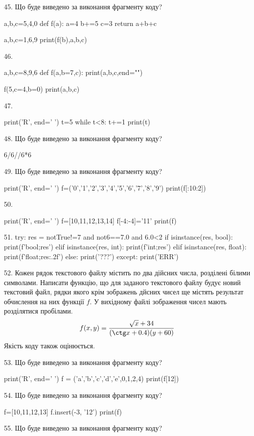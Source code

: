 \documentclass[11pt]{article}
\begin{document}
45. Що буде виведено за виконання фрагменту коду?

a,b,c=5,4,0
def f(a):
    a=4
    b+=5
    c=3
    return a+b+c

a,b,c=1,6,9
print(f(b),a,b,c)

46. 

a,b,c=8,9,6
def f(a,b=7,c):
    print(a,b,c,end="")

f(5,c=4,b=0)
print(a,b,c)


47. 

print('R', end=' ')
t=5
while t<8:
    t+=1
print(t)


48. Що буде виведено за виконання фрагменту коду?

6/6//6*6

49. Що буде виведено за виконання фрагменту коду?

print('R', end=' ')
f=('0','1','2','3','4','5','6','7','8','9')
print(f[:10:2])


50. 

print('R', end=' ')
f=[10,11,12,13,14]
f[-4:-4]='11'
print(f)


51. 
try:
    res = notTrue!=7 and not6==7.0 and 6.0<2
    if isinstance(res, bool):
        print(f'bool;{res}')
    elif isinstance(res, int):
        print(f'int;{res}')
    elif isinstance(res, float):
        print(f'float;{res:.2f}')
    else:
        print('???')
except:
    print('ERR')

52. 
Кожен рядок текстового файлу містить по два дійсних числа, розділені білими символами.
Написати функцію, що для заданого текстового файлу будує новий текстовий файл, рядки якого крім зображень дйсних чисел ще містять результат обчислення на них функції $f$. У вихідному файлі зображення чисел мають розділятися пробілами. 
$$f(x, y) =\frac{\sqrt x + 34}{(\ctg x + 0.4) (y + 60)}$$ 
Якість коду також оцінюється.


53. Що буде виведено за виконання фрагменту коду?

print('R', end=' ')
f = ('a','b','c','d','e',0,1,2,4)
print(f[12])


54. Що буде виведено за виконання фрагменту коду?

f=[10,11,12,13]
f.insert(-3, '12')
print(f)


55. Що буде виведено за виконання фрагменту коду?
\end{document}

